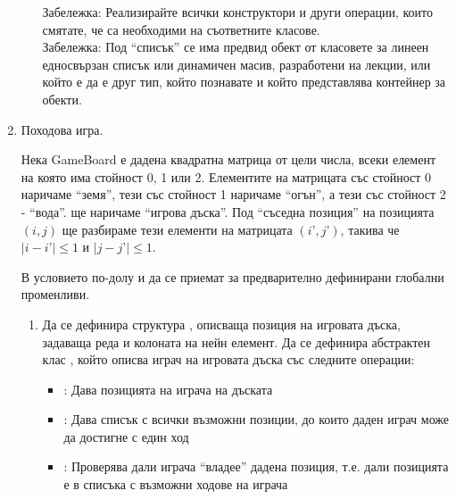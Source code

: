 \begin{enumerate}
\begin{enumerate}[label=\alph*)]


      \begin{flushleft}
      Забележка: Реализирайте всички конструктори и други операции, които смятате, че са необходими на съответните класове.\\

      Забележка: Под ``списък'' се има предвид обект от класовете за линеен едносвързан списък или динамичен масив, разработени на лекции, или който е да е друг тип, който познавате и който представлява контейнер за обекти.

      \end{flushleft}

    \end{enumerate}


    \item \label{zad:boardgame}Походова игра.

    Нека GameBoard е дадена квадратна матрица  от цели числа, всеки елемент на която има стойност 0, 1 или 2. Елементите на матрицата със стойност 0 наричаме ``земя'', тези със стойност 1 наричаме ``огън'', а тези със стойност 2 - ``вода''.  ще наричаме ``игрова дъска''. Под ``съседна позиция'' на позицията $(i,j)$ ще разбираме тези елементи на матрицата $(i’,j’)$, такива че $|i-i’| \leq 1$ и $|j-j’| \leq 1$.

    В условието по-долу  и  да се приемат за предварително дефинирани глобални променливи.

    \begin{enumerate}[label=\alph*)]
      \item Да се дефинира структура , описваща позиция на игровата дъска, задаваща реда и колоната на нейн елемент. Да се дефинира абстрактен клас , който описва играч на игровата дъска със следните операции:

      \begin{itemize}
        \item {}: Дава позицията на играча на дъската
        \item {}: Дава списък с всички възможни позиции, до които даден играч може да достигне с един ход
        \item {}: Проверява дали играча ``владее'' дадена позиция, т.е. дали позицията е в списъка с възможни ходове на играча


\end{itemize}
\end{enumerate}
\end{enumerate}
